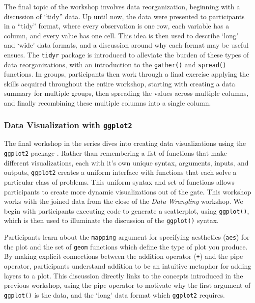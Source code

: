 \documentclass[12pt]{article}
\begin{document}
\quad The final topic of the workshop involves data reorganization, beginning with a discussion of ``tidy'' data. Up until now, the data were presented to participants in a ``tidy'' format, where every observation is one row, each variable has a column, and every value has one cell. This idea is then used to describe `long' and `wide' data formats, and a discussion around why each format may be useful ensues. The \texttt{tidyr} package is introduced to alleviate the burden of these types of data reorganizations, with an introduction to the \texttt{gather()} and \texttt{spread()} functions. In groups, participants then work through a final exercise applying the skills acquired throughout the entire workshop, starting with creating a data summary for multiple groups, then spreading the values across multiple columns, and finally recombining these multiple columns into a single column. 


\subsubsection{Data Visualization with \texttt{ggplot2}}
\label{sec:vizual} 

\quad The final workshop in the series dives into creating data visualizations using the \texttt{ggplot2} package \citep{ggplot}. Rather than remembering a list of functions that make different visualizations, each with it's own unique syntax, arguments, inputs, and outputs, \texttt{ggplot2} creates a uniform interface with functions that each solve a particular class of problems. This uniform syntax and set of functions allows participants to create more dynamic visualizations out of the gate. This workshop works with the joined data from the close of the \emph{Data Wrangling} workshop. We begin with participants executing code to generate a scatterplot, using \texttt{ggplot()}, which is then used to illuminate the discussion of the \texttt{ggplot()} syntax.


\quad Participants learn about the \texttt{mapping} argument for specifying aesthetics (\texttt{aes}) for the plot and the set of \texttt{geom} functions which define the type of plot you produce. By making explicit connections between the addition operator (\texttt{+}) and the pipe operator, participants understand addition to be an intuitive metaphor for adding layers to a plot. This discussion directly links to the concepts introduced in the previous workshop, using the pipe operator to motivate why the first argument of \texttt{ggplot()} is the data, and the `long' data format which \texttt{ggplot2} requires. 
\end{document}
